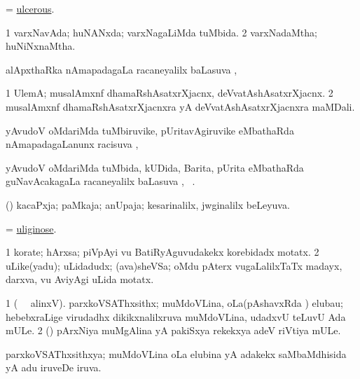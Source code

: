 \bentry
{} 
\gl{\gu}
\expl{}
\bmng
= \hyperlink{ulcerous}{ulcerous}. 
\emng
\eentry

\bentry
{} 
\gl{\gu}
\expl{}
\bmng
\bnum
\num{1} varxNavAda; huNANxda; varxNagaLiMda tuMbida. 
\num{2} varxNadaMtha; huNiNxnaMtha. 
\enum
\emng
\eentry

\bentry
{}
\gl{\uparx}
\expl{}
\bmng
alApxthaRka nAmapadagaLa racaneyalilx baLasuva \uparx, \udA\  
\emng
\eentry

\bentry
{} 
\gl{\nA}
\expl{}
\bmng
\bnum
\num{1} UlemA; musalAmxnf dhamaRshAsatxrXjacnx, deVvatAshAsatxrXjacnx. 
\num{2} musalAmxnf dhamaRshAsatxrXjacnxra yA deVvatAshAsatxrXjacnxra maMDali. 
\enum
\emng
\eentry

\bentry
{}
\gl{\uparx}
\expl{}
\bmng
yAvudoV oMdariMda tuMbiruvike, pUritavAgiruvike eMbathaRda nAmapadagaLanunx racisuva \uparx, \udA\  
\emng
\eentry

\bentry
{} 
\gl{\uparx}
\expl{}
\bmng
yAvudoV oMdariMda tuMbida, kUDida, Barita, pUrita eMbathaRda guNavAcakagaLa racaneyalilx baLasuva \uparx, \udA\ . 
\emng
\eentry

\bentry
{} 
\gl{\gu}
\expl{}
\bmng
(\savi) kacaPxja; paMkaja; anUpaja; kesarinalilx, jwginalilx beLeyuva. 
\emng
\eentry

\bentry
{} 
\gl{\gu}
\expl{}
\bmng
= \hyperlink{uliginose}{uliginose}. 
\emng
\eentry

\bentry
{} 
\gl{\nA}
\expl{}
\bmng
\bnum
\num{1} korate; hArxsa; piVpAyi \mo vu BatiRyAguvudakekx korebidadx motatx. 
\num{2} uLike(yadu); uLidadudx; (ava)sheVSa; oMdu pAterx \mo vugaLalilxTaTx madayx, darxva, \mo vu AviyAgi uLida motatx. 
\enum
\emng
\eentry

\bentry
{} 
\gl{\nA}
\bmng
\bnum
\num{1} (\bava\  \ucAcx\ alinxV). parxkoVSAThxsithx; muMdoVLina, oLa(pAshavxRda ) elubau; hebebxraLige virudadhx dikikxnalilxruva muMdoVLina, udadxvU teLuvU Ada mULe. 
\num{2} (\pArxvi) pArxNiya muMgAlina yA pakiSxya rekekxya adeV riVtiya mULe. 
\enum
\emng
\eentry

\bentry
{} 
\gl{\gu}
\expl{}
\bmng
parxkoVSAThxsithxya; muMdoVLina oLa elubina yA adakekx saMbaMdhisida yA adu iruveDe iruva. 
\emng
\eentry

